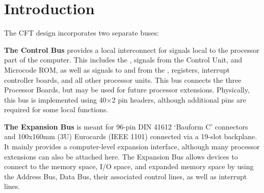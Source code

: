 





  
\section{Introduction}

The CFT design incorporates two separate buses:

\begin{description}

\item{\bfseries The Control Bus} provides a local interconnect for signals
  local to the processor part of the computer. This includes the \IBUS, signals
  from the Control Unit, and Microcode ROM, as well as signals to and from the
  \ALU, registers, interrupt controller boards, and all other processor
  units. This bus connects the three Processor Boards, but may be used for
  future processor extensions. Physically, this bus is implemented using 40×2
  pin headers, although additional pins are required for some local functions.

\item{\bfseries The Expansion Bus} is meant for 96-pin DIN 41612 ‘Bauform C’
  connectors and 100x160mm (3U) Eurocards (IEEE 1101) connected via a 19-slot
  backplane. It mainly provides a computer-level expansion interface, although
  many processor extensions can also be attached here. The Expansion Bus allows
  devices to connect to the memory space, I/O space, and expanded memory space
  by using the Address Bus, Data Bus, their associated control lines, as well
  as interrupt lines.

\end{description}

